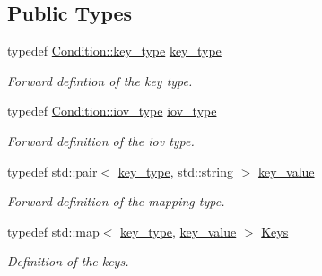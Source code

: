 \subsection*{Public Types}
\begin{DoxyCompactItemize}
\item 
typedef \hyperlink{class_d_d4hep_1_1_conditions_1_1_condition_a7528efa762e8cc072ef80ea67c3531f9}{Condition::key\_\-type} \hyperlink{class_d_d4hep_1_1_conditions_1_1_interna_1_1_condition_container_a7a4545b4b0536565feb7346bd97c63fa}{key\_\-type}
\begin{DoxyCompactList}\small\item\em Forward defintion of the key type. \item\end{DoxyCompactList}\item 
typedef \hyperlink{class_d_d4hep_1_1_i_o_v}{Condition::iov\_\-type} \hyperlink{class_d_d4hep_1_1_conditions_1_1_interna_1_1_condition_container_aa697bd92da7a05031b5eef63bb9f000b}{iov\_\-type}
\begin{DoxyCompactList}\small\item\em Forward definition of the iov type. \item\end{DoxyCompactList}\item 
typedef std::pair$<$ \hyperlink{class_d_d4hep_1_1_conditions_1_1_interna_1_1_condition_container_a7a4545b4b0536565feb7346bd97c63fa}{key\_\-type}, std::string $>$ \hyperlink{class_d_d4hep_1_1_conditions_1_1_interna_1_1_condition_container_a2a8452e68d48eb94553607e7d7ae13f6}{key\_\-value}
\begin{DoxyCompactList}\small\item\em Forward definition of the mapping type. \item\end{DoxyCompactList}\item 
typedef std::map$<$ \hyperlink{class_d_d4hep_1_1_conditions_1_1_interna_1_1_condition_container_a7a4545b4b0536565feb7346bd97c63fa}{key\_\-type}, \hyperlink{class_d_d4hep_1_1_conditions_1_1_interna_1_1_condition_container_a2a8452e68d48eb94553607e7d7ae13f6}{key\_\-value} $>$ \hyperlink{class_d_d4hep_1_1_conditions_1_1_interna_1_1_condition_container_a01f9461850ee260a6c76646f9619c8bb}{Keys}
\begin{DoxyCompactList}\small\item\em Definition of the keys. \item\end{DoxyCompactList}\end{DoxyCompactItemize}
